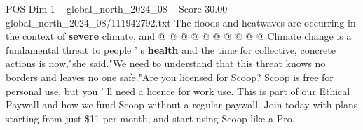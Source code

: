 \begin{textsample}{POS Dim 1 – global\_north\_2024\_08 – Score 30.00 – global\_north\_2024\_08/111942792.txt}
The floods and heatwaves are occurring in the context of \textbf{severe} climate, and @ @ @ @ @ @ @ @ @ @ Climate change is a fundamental threat to people ' s \textbf{health} and the time for collective, concrete actions is now,"she said."We need to understand that this threat knows no borders and leaves no one safe."Are you licensed for Scoop?
Scoop is free for personal use, but you ' ll need a licence for work use.
This is part of our Ethical Paywall and how we fund Scoop without a regular paywall.
Join today with plans starting from just \$11 per month, and start using Scoop like a Pro.

\end{textsample}
